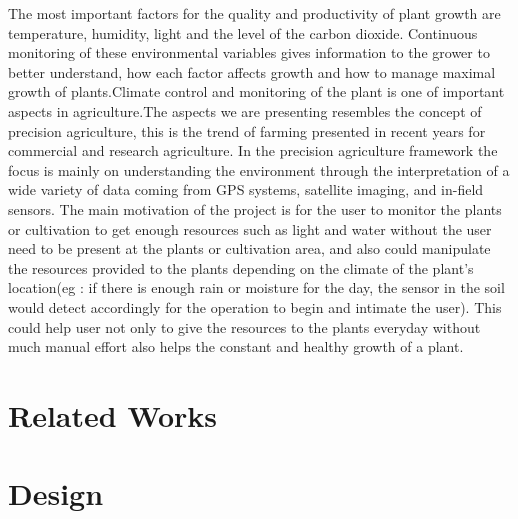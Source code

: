 \documentclass[10pt]{article}
\begin{document}
The most important factors for the quality and productivity of plant growth are temperature, humidity, light and the level of the carbon dioxide. Continuous monitoring of these environmental variables gives information to the grower to better understand, how each factor affects growth and how to manage maximal growth of plants.Climate control and monitoring of the plant is one of important aspects in agriculture.The aspects we are presenting resembles the concept of precision agriculture, this is the trend of farming presented in recent years for commercial and research agriculture. In the precision agriculture framework the focus is mainly on understanding the environment through the interpretation of a wide variety of data coming from GPS systems, satellite imaging, and in-field sensors. The main motivation of the project is for the user to monitor the plants or cultivation to get enough resources such as light and water without the user need to be present at the plants or cultivation area, and also could manipulate the resources provided to the plants depending on the climate of the plant’s location(eg : if there is enough rain or moisture for the day, the sensor in the soil would detect accordingly for the operation to begin and intimate the user). This could help user not only to give the resources to the plants everyday without much manual effort also helps the constant and healthy growth of a plant.


\section*{Related Works}



\section*{Design}
\end{document}
